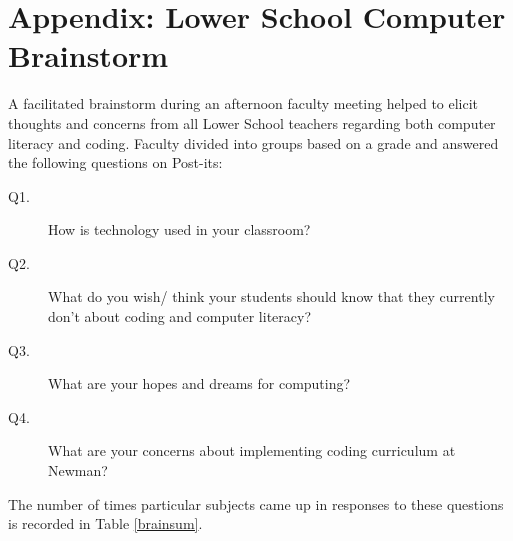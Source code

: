 \chapter{Appendix: Lower School Computer Brainstorm} %

\label{AppendixBRAIN} %


A facilitated brainstorm during an afternoon faculty meeting helped to elicit thoughts and concerns from all Lower School teachers regarding both computer literacy and coding. Faculty divided into groups based on a grade and answered the following questions on Post-its: \par
\begin{description}
	\item [Q1.] How is technology used in your classroom?
\item [Q2.] What do you wish/ think your students should know that they currently don't about coding and computer literacy?
\item [Q3.] What are your hopes and dreams for computing? 
\item [Q4.] What are your concerns about implementing coding curriculum at Newman?
\end{description}
The number of times particular subjects came up in responses to these questions is recorded in Table \ref{brainsum}.\par

